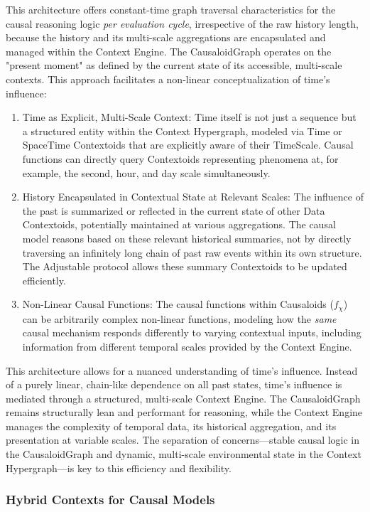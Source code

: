 This architecture offers constant-time graph traversal characteristics for the causal reasoning logic \textit{per evaluation cycle}, irrespective of the raw history length, because the history and its multi-scale aggregations are encapsulated and managed within the Context Engine. The CausaloidGraph operates on the "present moment" as defined by the current state of its accessible, multi-scale contexts. This approach facilitates a non-linear conceptualization of time's influence:
\begin{enumerate}
    \item Time as Explicit, Multi-Scale Context: Time itself is not just a sequence but a structured entity within the Context Hypergraph, modeled via Time or SpaceTime Contextoids that are explicitly aware of their TimeScale. Causal functions can directly query Contextoids representing phenomena at, for example, the second, hour, and day scale simultaneously.
    \item History Encapsulated in Contextual State at Relevant Scales: The influence of the past is summarized or reflected in the current state of other Data Contextoids, potentially maintained at various aggregations. The causal model reasons based on these relevant historical summaries, not by directly traversing an infinitely long chain of past raw events within its own structure. The Adjustable protocol allows these summary Contextoids to be updated efficiently.
    \item Non-Linear Causal Functions: The causal functions within Causaloids ($f_\chi$) can be arbitrarily complex non-linear functions, modeling how the \textit{same} causal mechanism responds differently to varying contextual inputs, including information from different temporal scales provided by the Context Engine.
\end{enumerate}
This architecture allows for a nuanced understanding of time's influence. Instead of a purely linear, chain-like dependence on all past states, time's influence is mediated through a structured, multi-scale Context Engine. The CausaloidGraph remains structurally lean and performant for reasoning, while the Context Engine manages the complexity of temporal data, its historical aggregation, and its presentation at variable scales. The separation of concerns—stable causal logic in the CausaloidGraph and dynamic, multi-scale environmental state in the Context Hypergraph—is key to this efficiency and flexibility.

\subsubsection{Hybrid Contexts for Causal Models}
\label{subsubsec:adv_hybrid_context_for_causality}

